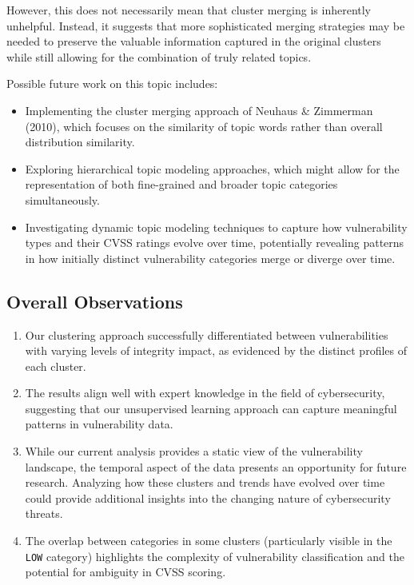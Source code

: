 \documentclass[12pt]{article}
\begin{document}
However, this does not necessarily mean that cluster merging is inherently unhelpful. Instead, it
suggests that more sophisticated merging strategies may be needed to preserve the valuable
information captured in the original clusters while still allowing for the combination of truly
related topics.

Possible future work on this topic includes:

\begin{itemize}

	\item Implementing the cluster merging approach of Neuhaus \& Zimmerman (2010), which focuses on
	      the similarity of topic words rather than overall distribution similarity.

	\item Exploring hierarchical topic modeling approaches, which might allow for the representation
	      of both fine-grained and broader topic categories simultaneously.

	\item Investigating dynamic topic modeling techniques to capture how vulnerability types and
	      their CVSS ratings evolve over time, potentially revealing patterns in how initially
	      distinct vulnerability categories merge or diverge over time.

\end{itemize}


\subsection{Overall Observations}

\begin{enumerate}

	\item Our clustering approach successfully differentiated between vulnerabilities with varying
	      levels of integrity impact, as evidenced by the distinct profiles of each cluster.

	\item The results align well with expert knowledge in the field of cybersecurity, suggesting
	      that our unsupervised learning approach can capture meaningful patterns in vulnerability
	      data.

	\item While our current analysis provides a static view of the vulnerability landscape, the
	      temporal aspect of the data presents an opportunity for future research. Analyzing how these
	      clusters and trends have evolved over time could provide additional insights into the
	      changing nature of cybersecurity threats.

	\item The overlap between categories in some clusters (particularly visible in the \texttt{LOW}
	      category) highlights the complexity of vulnerability classification and the potential for
	      ambiguity in CVSS scoring.

\end{enumerate}
\end{document}
